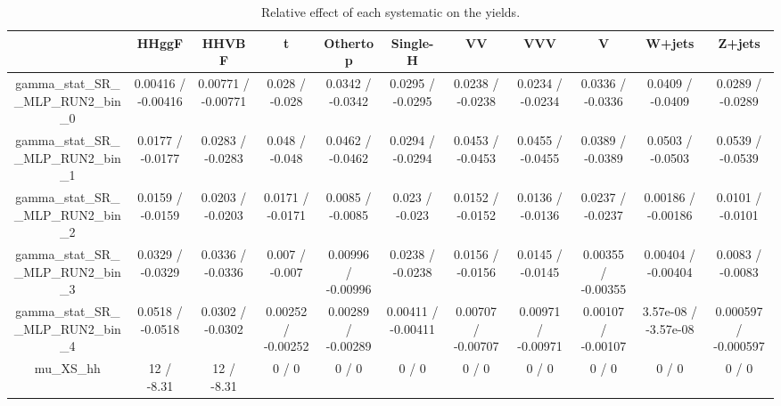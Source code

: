 \documentclass[10pt]{article}
\begin{document}
\begin{table}[htbp]
\begin{center}
\begin{tabular}{|c|c|c|c|c|c|c|c|c|c|c|}
\hline 
      & HHggF      & HHVBF      & t      & Othertop      & Single-H      & VV      & VVV      & V      & W+jets      & Z+jets \\ 
\hline 
  gamma_stat_SR__MLP_RUN2_bin_0 & 0.00416 / -0.00416 & 0.00771 / -0.00771 & 0.028 / -0.028 & 0.0342 / -0.0342 & 0.0295 / -0.0295 & 0.0238 / -0.0238 & 0.0234 / -0.0234 & 0.0336 / -0.0336 & 0.0409 / -0.0409 & 0.0289 / -0.0289 \\ 
  gamma_stat_SR__MLP_RUN2_bin_1 & 0.0177 / -0.0177 & 0.0283 / -0.0283 & 0.048 / -0.048 & 0.0462 / -0.0462 & 0.0294 / -0.0294 & 0.0453 / -0.0453 & 0.0455 / -0.0455 & 0.0389 / -0.0389 & 0.0503 / -0.0503 & 0.0539 / -0.0539 \\ 
  gamma_stat_SR__MLP_RUN2_bin_2 & 0.0159 / -0.0159 & 0.0203 / -0.0203 & 0.0171 / -0.0171 & 0.0085 / -0.0085 & 0.023 / -0.023 & 0.0152 / -0.0152 & 0.0136 / -0.0136 & 0.0237 / -0.0237 & 0.00186 / -0.00186 & 0.0101 / -0.0101 \\ 
  gamma_stat_SR__MLP_RUN2_bin_3 & 0.0329 / -0.0329 & 0.0336 / -0.0336 & 0.007 / -0.007 & 0.00996 / -0.00996 & 0.0238 / -0.0238 & 0.0156 / -0.0156 & 0.0145 / -0.0145 & 0.00355 / -0.00355 & 0.00404 / -0.00404 & 0.0083 / -0.0083 \\ 
  gamma_stat_SR__MLP_RUN2_bin_4 & 0.0518 / -0.0518 & 0.0302 / -0.0302 & 0.00252 / -0.00252 & 0.00289 / -0.00289 & 0.00411 / -0.00411 & 0.00707 / -0.00707 & 0.00971 / -0.00971 & 0.00107 / -0.00107 & 3.57e-08 / -3.57e-08 & 0.000597 / -0.000597 \\ 
  mu_XS_hh & 12 / -8.31 & 12 / -8.31 & 0 / 0 & 0 / 0 & 0 / 0 & 0 / 0 & 0 / 0 & 0 / 0 & 0 / 0 & 0 / 0 \\ 
\hline 
\end{tabular} 
\caption{Relative effect of each systematic on the yields.} 
\end{center} 
\end{table} 
\end{document}
